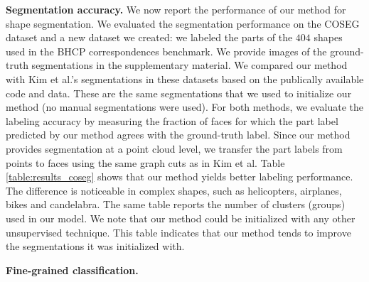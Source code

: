 \textbf{Segmentation accuracy.} We now report the performance of our method for shape segmentation. We evaluated the segmentation performance on the COSEG dataset \cite{Wang12} and a new dataset we created: we labeled the parts of the $404$ shapes used in the BHCP correspondences benchmark. We provide images of the ground-truth segmentations in the supplementary material. We compared our method with Kim et al.'s segmentations in these datasets based on the publically available code and data. These are the same segmentations that we used to initialize our method (no manual segmentations were used). For both methods, we evaluate the labeling accuracy by measuring the fraction of faces for which the part label predicted by our method agrees with the ground-truth label. Since our method provides segmentation at a point cloud level, we transfer the part labels from points to faces using the same graph cuts as in Kim et al. Table \ref{table:results_coseg} shows that our method yields better labeling performance. The difference is noticeable in complex shapes, such as helicopters, airplanes, bikes and candelabra.  The same table reports the number of clusters (groups) used in our model. We note that our method could be initialized with any other unsupervised technique. This table indicates that our method tends to improve the segmentations it was initialized with. 

\textbf{Fine-grained classification.} 

